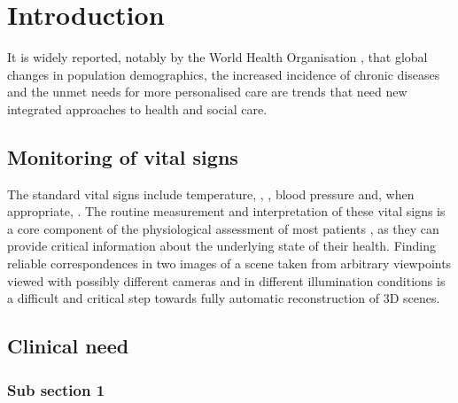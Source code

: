 \chapter{Introduction}
\label{chapter:introduction}

It is widely reported, notably by the World Health Organisation \cite{stroetmann2010can}, that global changes in population demographics, the increased incidence of chronic diseases and the unmet needs for more personalised care are trends that need new integrated approaches to health and social care.

\lipsum[1-2]\cite{brooks1984infrared}

\lipsum[3-4]\cite{barker1987pulse,peacock1998oxygen,moller1993randomized}

\section{Monitoring of vital signs}

The standard vital signs include temperature, , , blood pressure and, when appropriate, . The routine measurement and interpretation of these vital signs is a core component of the physiological assessment of most patients \cite{prior1977physical,goldberg2005practical}, as they can provide critical information about the underlying state of their health. Finding reliable correspondences in two images of a scene taken from arbitrary viewpoints viewed with possibly different cameras and in different illumination conditions is a difficult and critical step towards fully automatic reconstruction of 3D scenes\cite{hartley2003multiple}.

\lipsum[7-11]\cite{priya2012transition,haralick1973textural,Grass2012Online,NoninPulseOxOnline}

\section{Clinical need}

\lipsum[1-2]\cite{HidalgoEquivitalEQ02Online,poh2011advancements,poh2010non,verkruysse2008remote,wieringa2005contactless,wiki:bayerfilter,nonin9560oem,Mas_Fernandez_2003,hartley2003multiple}

\subsection{Sub section 1}

\lipsum[3-6]\cite{schmidt1997animal,4036907,Orbanz2008,varjavand2002interactive,report:PCESC2005,HSU_05_2012,collins2015relating,abdi2010principal}

